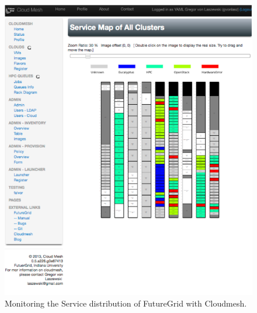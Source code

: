 \documentclass{tex/sig-alternate}
\begin{document}
{\begin{figure}[htb]
  \centering
    \includegraphics[width=1.0\columnwidth]{images/rainbow.pdf}
  \caption{Monitoring the Service distribution of FutureGrid with Cloudmesh.}
\end{figure}


}
\end{document}
